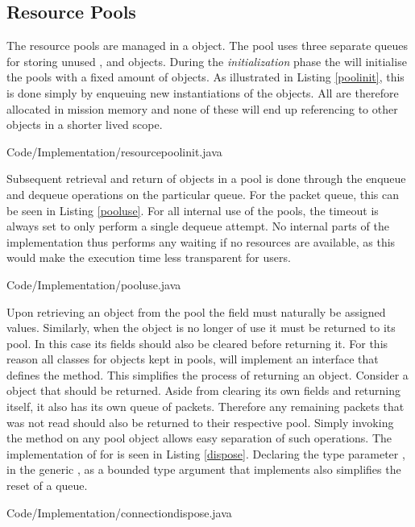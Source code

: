 \subsection{Resource Pools} %
\label{sub:resource_pools}
The resource pools are managed in a  object. The pool uses three separate queues for storing unused ,  and  objects. During the \textit{initialization} phase the  will initialise the pools with a fixed amount of objects. As illustrated in Listing \ref{poolinit}, this is done simply by enqueuing new instantiations of the objects. All are therefore allocated in mission memory and none of these will end up referencing to other objects in a shorter lived scope. 

{Code/Implementation/resourcepoolinit.java}

Subsequent retrieval and return of objects in a pool is done through the enqueue and dequeue operations on the particular queue. For the packet queue, this can be seen in Listing \ref{pooluse}. For all internal use of the pools, the timeout is always set to only perform a single dequeue attempt. No internal parts of the implementation thus performs any waiting if no resources are available, as this would make the execution time less transparent for users.

{Code/Implementation/pooluse.java}

Upon retrieving an object from the pool the field must naturally be assigned values. Similarly, when the object is no longer of use it must be returned to its pool. In this case its fields should also be cleared before returning it. For this reason all classes for objects kept in pools, will implement an  interface that defines the  method. This simplifies the process of returning an object. Consider a  object that should be returned. Aside from clearing its own fields and returning itself, it also has its own queue of packets. Therefore any remaining packets that was not read should also be returned to their respective pool. Simply invoking the  method on any pool object allows easy separation of such operations. The implementation of  for  is seen in Listing \ref{dispose}. Declaring the type parameter , in the generic , as a bounded type argument that implements  also simplifies the reset of a queue.

{Code/Implementation/connectiondispose.java}

